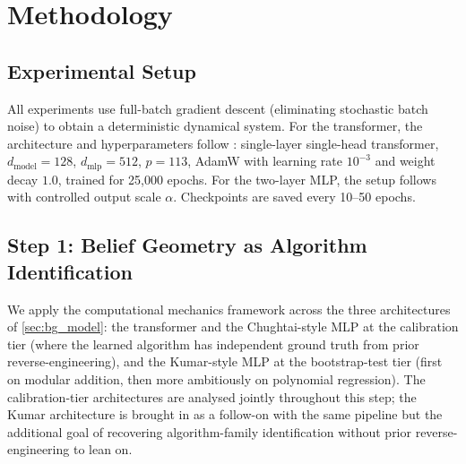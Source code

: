\documentclass[11pt,a4paper]{article}
\begin{document}
\section{Methodology}

\subsection{Experimental Setup}

All experiments use full-batch gradient descent (eliminating stochastic batch noise) to obtain a deterministic dynamical system. For the transformer, the architecture and hyperparameters follow \citet{poncini2025compmech}: single-layer single-head transformer, $d_{\mathrm{model}} = 128$, $d_{\mathrm{mlp}} = 512$, $p = 113$, AdamW with learning rate $10^{-3}$ and weight decay $1.0$, trained for 25,000 epochs. For the two-layer MLP, the setup follows \citet{kumar2024grokking} with controlled output scale $\alpha$. Checkpoints are saved every 10--50 epochs.

\subsection{Step 1: Belief Geometry as Algorithm Identification}\label{sec:belief}

We apply the computational mechanics framework across the three architectures of \cref{sec:bg_model}: the transformer and the Chughtai-style MLP at the calibration tier (where the learned algorithm has independent ground truth from prior reverse-engineering), and the Kumar-style MLP at the bootstrap-test tier (first on modular addition, then more ambitiously on polynomial regression). The calibration-tier architectures are analysed jointly throughout this step; the Kumar architecture is brought in as a follow-on with the same pipeline but the additional goal of recovering algorithm-family identification without prior reverse-engineering to lean on.
\end{document}
